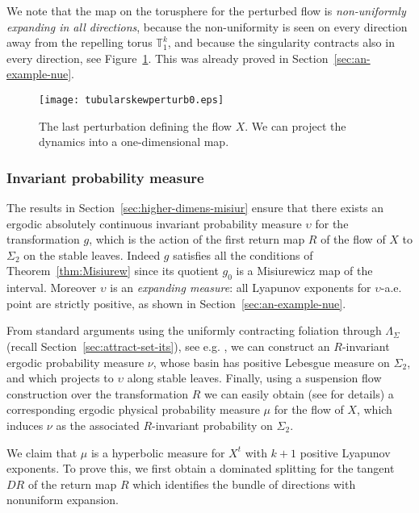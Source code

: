 \documentclass[reqno,12pt,a4paper]{amsart}
\theoremstyle{plain}
\theoremstyle{definition}
\begin{document}
We note that the map on the torusphere for the perturbed
flow is \emph{non-uniformly expanding in all directions},
because the non-uniformity is seen on every direction away
from the repelling torus ${{\mathbb T}}_1^k$, and because the
singularity contracts also in every direction, see
Figure~\ref{fig:symperturb0}. This was already proved in
Section~\ref{sec:an-example-nue}.
\begin{figure}[htpb]
  \centering
  \texttt{[image: tubularskewperturb0.eps]}
  \caption{\label{fig:symperturb0} The last perturbation
    defining the flow $X$. We can project the dynamics into
    a one-dimensional map.}
\end{figure}

\subsubsection{Invariant probability measure}
\label{sec:invari-probab-measur}

The results in Section~\ref{sec:higher-dimens-misiur} ensure
that there exists an ergodic absolutely continuous invariant
probability measure $\upsilon$ for the transformation $g$,
which is the action of the first return map $R$ of the flow
of $X$ to $\Sigma_2$ on the stable leaves. Indeed $g$
satisfies all the conditions of Theorem~\ref{thm:Misiurew}
since its quotient $g_0$ is a Misiurewicz map of the
interval.  Moreover $\upsilon$ is an \emph{expanding
  measure}: all Lyapunov exponents for $\upsilon$-a.e. point
are strictly positive, as shown in
Section~\ref{sec:an-example-nue}.

From standard arguments using the uniformly contracting
foliation through $\Lambda_\Sigma$ (recall
Section~\ref{sec:attract-set-its}), see e.g. \cite[Section
6]{APPV}, we can construct an $R$-invariant ergodic
probability measure $\nu$, whose basin has positive Lebesgue
measure on $\Sigma_2$, and which projects to $\upsilon$
along stable leaves. Finally, using a suspension flow
construction over the transformation $R$ we can easily
obtain (see \cite[Section 6]{APPV} for details) a
corresponding ergodic physical probability measure $\mu$ for
the flow of $X$, which induces $\nu$ as the associated
$R$-invariant probability on $\Sigma_2$.

We claim that $\mu$ is a hyperbolic measure for $X^t$ with
$k+1$ positive Lyapunov exponents. To prove this, we first
obtain a dominated splitting for the tangent $DR$ of the
return map $R$ which identifies the bundle of directions
with nonuniform expansion.
\end{document}
